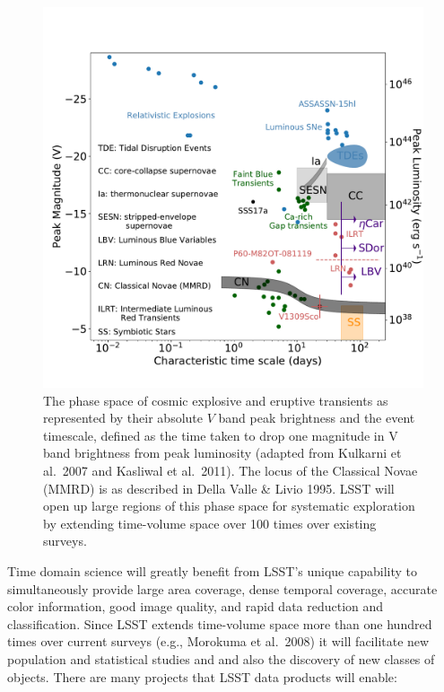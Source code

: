 \begin{figure}
\hskip -0.1in
\vskip -0.1in
\includegraphics[width=1.0\hsize,clip]{taumv_updated.pdf}
\caption{The phase space of cosmic explosive and eruptive transients
  as represented by their absolute $V$ band peak brightness and the
  event timescale, defined as the time taken to drop one magnitude in
  V band brightness from peak luminosity (adapted from Kulkarni et
  al.~2007 and Kasliwal et al.~2011).  The locus of the Classical
  Novae (MMRD) is as described in Della Valle \& Livio 1995.  LSST
  will open up large regions of this phase space for systematic
  exploration by extending time-volume space over 100 times over
  existing surveys.}
\label{Fig:shri}
\end{figure}

Time domain science will greatly benefit from LSST's unique capability
to simultaneously provide large area coverage, dense temporal
coverage, accurate color information, good image quality, and rapid
data reduction and classification. Since LSST extends time-volume
space more than one hundred times over current surveys (e.g., Morokuma
et al.~2008) it will facilitate new population and statistical studies and
and also the discovery of new classes of
objects.  There are many projects that LSST data products will enable:

